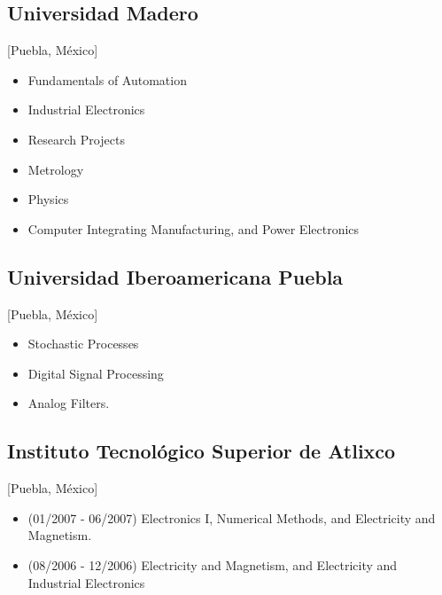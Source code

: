 \documentclass{mycv}
\begin{document}
\subsection{Universidad Madero}[Puebla, M\'exico]
\begin{positions}
\end{positions}
\begin{itemize}
	\item Fundamentals of Automation \href{https://sites.google.com/site/perezxochicale/digital-electronics}{\faExternalLink}
	\item Industrial Electronics \href{https://sites.google.com/site/perezxochicale/ie}{\faExternalLink}
	\item Research Projects \href{https://sites.google.com/site/perezxochicale/latex/thesistemplate}{\faExternalLink}
	\item Metrology \href{https://sites.google.com/site/perezxochicale/metrology}{\faExternalLink}
	\item Physics \href{http://goo.gl/fffnG}{\faExternalLink}
	\item Computer Integrating Manufacturing, and Power Electronics
\end{itemize}

\subsection{Universidad Iberoamericana Puebla}[Puebla, M\'exico]
\begin{positions}
\end{positions}
\begin{itemize}
	\item Stochastic Processes \href{https://sites.google.com/site/perezxochicale/stochastic-processes-course}{\faExternalLink}
	\item Digital Signal Processing \href{https://sites.google.com/site/perezxochicale/digital-signal-processing-course}{\faExternalLink}
	\item Analog Filters.
\end{itemize}

\subsection{Instituto Tecnol\'ogico Superior de Atlixco}[Puebla, M\'exico]
\begin{positions}
\end{positions}
\begin{itemize}
	\item (01/2007 - 06/2007) Electronics I, Numerical Methods, and Electricity and Magnetism. 
	\item (08/2006 - 12/2006) Electricity and Magnetism, and Electricity and Industrial Electronics 
\end{itemize}
\end{document}
